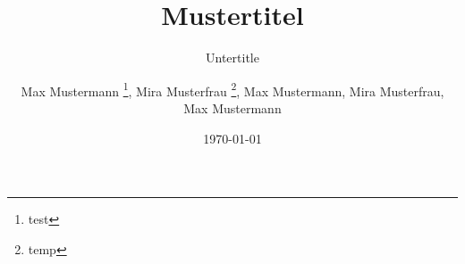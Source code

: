 \author{
	Max Mustermann \thanks{test},
	Mira Musterfrau \thanks{temp},
	Max Mustermann,
	Mira Musterfrau,
	Max Mustermann
}
\titlehead{Fachbereich}
\subject{Grund der Arbeit}
\title{Mustertitel}
\subtitle{Untertitle}
\date{\today}
\publishers{HERAUSGEBER}
